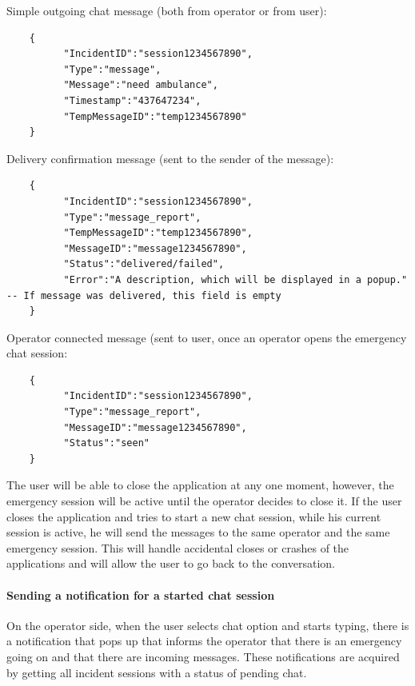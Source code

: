 \documentclass{article}
\begin{document}
Simple outgoing chat message (both from operator or from user):
\begin{lstlisting}
	{
          "IncidentID":"session1234567890",
          "Type":"message",
          "Message":"need ambulance",
          "Timestamp":"437647234",
          "TempMessageID":"temp1234567890"
	}
\end{lstlisting}

Delivery confirmation message (sent to the sender of the message):
\begin{lstlisting}
	{
          "IncidentID":"session1234567890",
          "Type":"message_report",
          "TempMessageID":"temp1234567890",
          "MessageID":"message1234567890",
          "Status":"delivered/failed",
          "Error":"A description, which will be displayed in a popup." -- If message was delivered, this field is empty
	}
\end{lstlisting}

Operator connected message (sent to user, once an operator opens the emergency chat session:
\begin{lstlisting}
	{
          "IncidentID":"session1234567890",
          "Type":"message_report",
          "MessageID":"message1234567890",
          "Status":"seen"
	}
\end{lstlisting}
The user will be able to close the application at any one moment, however, the emergency session will be active until the operator decides to close it. If the user closes the application and tries to start a new chat session, while his current session is active, he will send the messages to the same operator and the same emergency session. This will handle accidental closes or crashes of the applications and will allow the user to go back to the conversation.

\paragraph{Sending a notification for a started chat session}
On the operator side, when the user selects chat option and starts typing, there is a notification that pops up that informs the operator that there is an emergency going on and that there are incoming messages. These notifications are acquired by getting all incident sessions with a status of pending chat.
\end{document}
